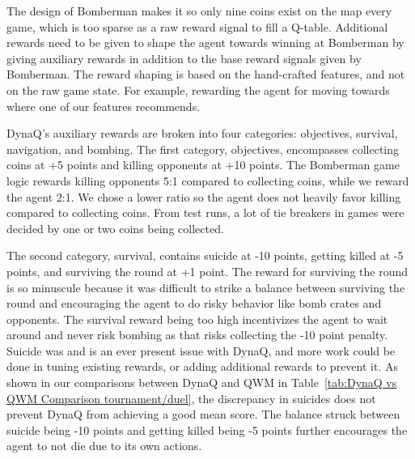\documentclass[article, 10pt]{IEEEtran}
\begin{document}
The design of Bomberman makes it so only nine coins exist on the map every game, which is too sparse as a raw reward signal to fill a Q-table. Additional rewards need to be given to shape the agent towards winning at Bomberman by giving auxiliary rewards in addition to the base reward signals given by Bomberman. The reward shaping is based on the hand-crafted features, and not on the raw game state. For example, rewarding the agent for moving towards where one of our features recommends.

DynaQ's auxiliary rewards are broken into four categories: objectives, survival, navigation, and bombing. The first category, objectives, encompasses collecting coins at +5 points and killing opponents at +10 points. The Bomberman game logic rewards killing opponents 5:1 compared to collecting coins, while we reward the agent 2:1. We chose a lower ratio so the agent does not heavily favor killing compared to collecting coins. From test runs, a lot of tie breakers in games were decided by one or two coins being collected. 

The second category, survival, contains suicide at -10 points, getting killed at -5 points, and surviving the round at +1 point. The reward for surviving the round is so minuscule because it was difficult to strike a balance between surviving the round and encouraging the agent to do risky behavior like bomb crates and opponents. The survival reward being too high incentivizes the agent to wait around and never risk bombing as that risks collecting the -10 point penalty. Suicide was and is an ever present issue with DynaQ, and more work could be done in tuning existing rewards, or adding additional rewards to prevent it. As shown in our comparisons between DynaQ and QWM in Table~\ref{tab:DynaQ vs QWM Comparison tournament/duel}, the discrepancy in suicides does not prevent DynaQ from achieving a good mean score. The balance struck between suicide being -10 points and getting killed being -5 points further encourages the agent to not die due to its own actions.
\end{document}
